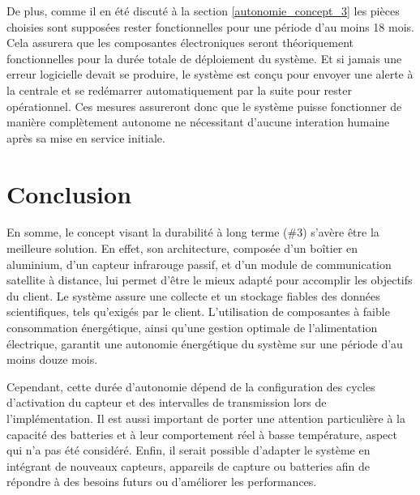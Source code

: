 \bigskip
De plus, comme il en été discuté à la section \ref{autonomie_concept_3} les pièces choisies sont supposées rester fonctionnelles pour une période d'au moins 18 mois.
Cela assurera que les composantes électroniques seront théoriquement fonctionnelles pour la durée totale de déploiement du système. Et si jamais une erreur logicielle devait
se produire, le système est conçu pour envoyer une alerte à la centrale et se redémarrer automatiquement par la suite pour rester opérationnel. Ces mesures assureront donc que
le système puisse fonctionner de manière complètement autonome ne nécessitant d'aucune interation humaine après sa mise en service initiale.


\newpage
\section{Conclusion}
En somme, le concept visant la durabilité à long terme (\#3) s'avère être la meilleure solution.
En effet, son architecture, composée d'un boîtier en aluminium, d'un capteur infrarouge passif, et d'un module de communication satellite à distance, lui permet d'être le mieux adapté pour accomplir les objectifs du client.
Le système assure une collecte et un stockage fiables des données scientifiques, tels qu’exigés par le client.
L'utilisation de composantes à faible consommation énergétique, ainsi qu'une gestion optimale de l'alimentation électrique, garantit une autonomie énergétique du système sur une période d'au moins douze mois.

\bigskip
Cependant, cette durée d'autonomie dépend de la configuration des cycles d'activation du capteur et des intervalles de transmission lors de l'implémentation.
Il est aussi important de porter une attention particulière à la capacité des batteries et à leur comportement réel à basse température, aspect qui n'a pas été considéré.
Enfin, il serait possible d’adapter le système en intégrant de nouveaux capteurs, appareils de capture ou batteries afin de répondre à des besoins futurs ou d’améliorer les performances.

